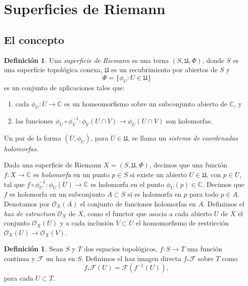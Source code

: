 \documentclass[12pt,a4paper]{article}
\theoremstyle{definition} \newtheorem{defn}[thm]{Definición}
\theoremstyle{definition} \newtheorem{ejemplo}[thm]{Ejemplo}
\theoremstyle{definition} \newtheorem{ejercicio}[thm]{Ejercicio}
\def\CC{\mathbb{C}}
\def\OO{\mathscr{O}}
\begin{document}
\section{Superficies de Riemann}

\subsection{El concepto}
\begin{defn}
  Una \emph{superficie de Riemann} es una terna $(S,\mathfrak{U},\Phi)$, donde $S$ es una superficie topológica conexa, $\mathfrak{U}$ es un recubrimiento por abiertos de $S$ y $$\Phi=\{\phi_U: U\in \mathfrak{U}\}$$ es un conjunto de aplicaciones tales que:
  \begin{enumerate}
    \item cada $\phi_U:U\rightarrow \CC$ es un homeomorfismo sobre un subconjunto abierto de $\CC$, y
    \item las funciones $\phi_U \circ \phi_V^{-1}: \phi_V(U\cap V) \rightarrow \phi_U(U\cap V)$ son holomorfas.
  \end{enumerate}

  Un par de la forma $(U,\phi_U)$, para $U\in \mathfrak{U}$, se llama un \emph{sistema de coordenadas holomorfas}.
\end{defn}

Dada una superficie de Riemann $X=(S,\mathfrak{U},\Phi)$, decimos que una función $f:X\rightarrow \CC$ es \emph{holomorfa} en un punto $p \in S$ si existe un abierto $U\in \mathfrak{U}$, con $p\in U$, tal que $f\circ \phi_U^{-1}:\phi_U(U) \rightarrow \CC$ es holomorfa en el punto $\phi_U(p) \in \CC$. Decimos que $f$ es holomorfa en un subconjunto $A\subset S$ si es holomorfa en $p$ para todo $p\in A$. Denotamos por $\OO_X(A)$ el conjunto de funciones holomorfas en $A$. Definimos el \emph{haz de estructura} $\OO_X$ de $X$, como el functor que asocia a cada abierto $U$ de $X$ el conjunto $\OO_X(U)$ y a cada inclusión $V\subset U$ el homomorfismo de restricción $\OO_X(U)\rightarrow \OO_X(V)$.

\begin{defn}
  Sean $S$ y $T$ dos espacios topológicos, $f:S\rightarrow T$ una función continua y $\mathscr{F}$ un haz en $S$. Definimos el haz imagen directa $f_*\mathscr{F}$ sobre $T$ como 
  \begin{equation*}
    f_*\mathscr{F}(U)=\mathscr{F}(f^{-1}(U)),
  \end{equation*}
  para cada $U\subset T$.
\end{defn}
\end{document}
